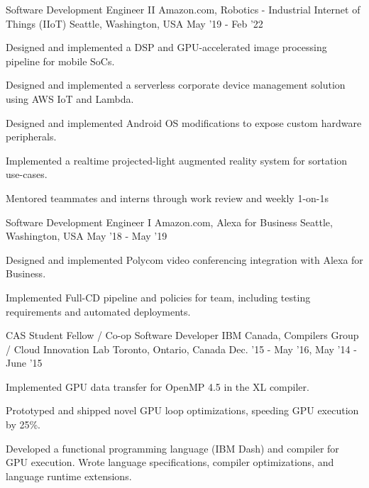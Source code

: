 \begin{cventries}
{    }
\vspace{4mm}
\cventry
    {Software Development Engineer II} %
    {Amazon.com, Robotics - Industrial Internet of Things (IIoT)} %
    {Seattle, Washington, USA} %
    {May '19 - Feb '22} %
    {
        \begin{cvitems}
            \item Designed and implemented a DSP and GPU-accelerated image processing pipeline for mobile SoCs.
            \item Designed and implemented a serverless corporate device management solution using AWS IoT and Lambda.
            \item Designed and implemented Android OS modifications to expose custom hardware peripherals.
            \item Implemented a realtime projected-light augmented reality system for sortation use-cases.
            \item Mentored teammates and interns through work review and weekly 1-on-1s
        \end{cvitems}
    }
\vspace{4mm}
\cventry
    {Software Development Engineer I} %
    {Amazon.com, Alexa for Business} %
    {Seattle, Washington, USA} %
    {May '18 - May '19} %
    {
        \begin{cvitems}
            \item Designed and implemented Polycom video conferencing integration with Alexa for Business.
            \item Implemented Full-CD pipeline and policies for team, including testing requirements and automated deployments.
        \end{cvitems}
    }
\vspace{4mm}
\cventry
    {CAS Student Fellow / Co-op Software Developer} %
    {IBM Canada, Compilers Group / Cloud Innovation Lab} %
    {Toronto, Ontario, Canada} %
    {Dec. '15 - May '16, May '14 - June '15} %
    {
        \begin{cvitems}
            \item Implemented GPU data transfer for OpenMP 4.5 in the XL compiler.
            \item Prototyped and shipped novel GPU loop optimizations, speeding GPU execution by 25\%.
            \item Developed a functional programming language (IBM Dash) and compiler for GPU execution. Wrote language specifications, compiler optimizations, and language runtime extensions.

\end{cvitems}}
\end{cventries}
